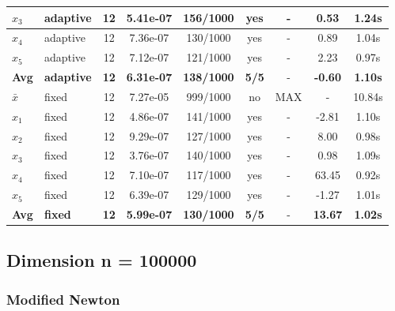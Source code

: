 \begin{longtable}{|l|l|c|c|c|c|c|c|c|}
\hline
$x_3$ & adaptive & 12 & 5.41e-07 & 156/1000 & yes & - & 0.53 & 1.24s \\
\hline
$x_4$ & adaptive & 12 & 7.36e-07 & 130/1000 & yes & - & 0.89 & 1.04s \\
\hline
$x_5$ & adaptive & 12 & 7.12e-07 & 121/1000 & yes & - & 2.23 & 0.97s \\
\hline
\hline\hline
\textbf{Avg} & \textbf{adaptive} & \textbf{12} & \textbf{6.31e-07} & \textbf{138/1000} & \textbf{5/5} & - & \textbf{-0.60} & \textbf{1.10s} \\
\hline\hline
\hline
$\bar{x}$ & fixed & 12 & 7.27e-05 & 999/1000 & no & MAX & - & 10.84s \\
\hline
$x_1$ & fixed & 12 & 4.86e-07 & 141/1000 & yes & - & -2.81 & 1.10s \\
\hline
$x_2$ & fixed & 12 & 9.29e-07 & 127/1000 & yes & - & 8.00 & 0.98s \\
\hline
$x_3$ & fixed & 12 & 3.76e-07 & 140/1000 & yes & - & 0.98 & 1.09s \\
\hline
$x_4$ & fixed & 12 & 7.10e-07 & 117/1000 & yes & - & 63.45 & 0.92s \\
\hline
$x_5$ & fixed & 12 & 6.39e-07 & 129/1000 & yes & - & -1.27 & 1.01s \\
\hline
\hline\hline
\textbf{Avg} & \textbf{fixed} & \textbf{12} & \textbf{5.99e-07} & \textbf{130/1000} & \textbf{5/5} & - & \textbf{13.67} & \textbf{1.02s} \\
\hline\hline
\end{longtable}


\subsection{Dimension n = 100000}

\subsubsection{Modified Newton}

